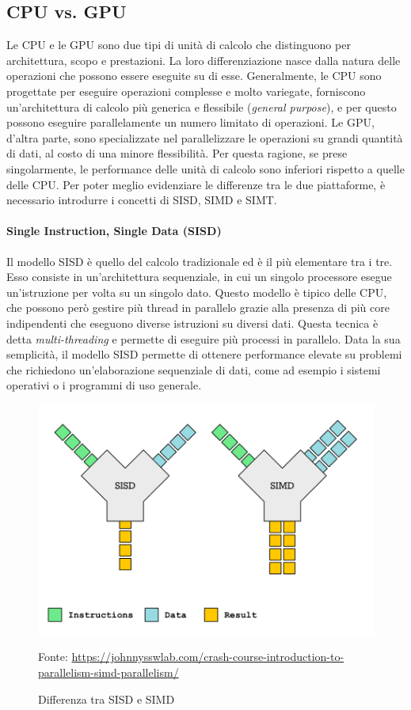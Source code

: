\subsection{CPU vs. GPU}
\label{subsec:cpuvsgpu}

Le CPU e le GPU sono due tipi di unità di calcolo che distinguono per
architettura, scopo e prestazioni. La loro differenziazione nasce dalla natura
delle operazioni che possono essere eseguite su di esse. Generalmente, le CPU
sono progettate per eseguire operazioni complesse e molto variegate, forniscono un'architettura
di calcolo più generica e flessibile (\textit{general purpose}), e per questo possono
eseguire parallelamente un numero limitato di operazioni. Le GPU, d'altra parte,
sono specializzate nel parallelizzare le operazioni su grandi quantità di dati, al
costo di una minore flessibilità. Per questa ragione, se prese singolarmente, le
performance delle unità di calcolo sono inferiori rispetto a quelle delle CPU. Per
poter meglio evidenziare le differenze tra le due piattaforme, è necessario
introdurre i concetti di SISD, SIMD e SIMT.

\paragraph{Single Instruction, Single Data (SISD)}
\label{para:simd}

Il modello SISD è quello del calcolo tradizionale ed è il più elementare tra i tre.
Esso consiste in un'architettura sequenziale, in cui un singolo processore esegue
un'istruzione per volta su un singolo dato. Questo modello è tipico delle CPU, che
possono però gestire più thread in parallelo grazie alla presenza di più core indipendenti
che eseguono diverse istruzioni su diversi dati. Questa tecnica è detta \textit{multi-threading}
e permette di eseguire più processi in parallelo. Data la sua semplicità, il modello
SISD permette di ottenere performance elevate su problemi che richiedono un'elaborazione
sequenziale di dati, come ad esempio i sistemi operativi o i programmi di uso
generale.

\begin{figure}[h!]
  \centering
  \includegraphics[width=.40\linewidth]{images/examples/sisd-simd.png}
  \caption{Differenza tra SISD e SIMD}
  \label{fig:sisd-simt} \footnotesize{Fonte: \url{https://johnnysswlab.com/crash-course-introduction-to-parallelism-simd-parallelism/}}
\end{figure}

